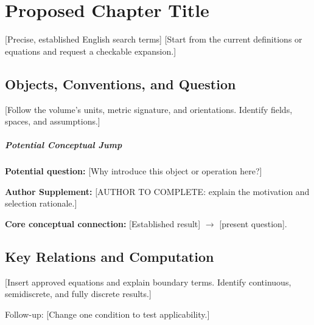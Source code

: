 \chapter{Proposed Chapter Title}\label{template:v2}
\begin{chaptersummary}
\end{chaptersummary}
{[Precise, established English search terms]}
{[Start from the current definitions or equations and request a checkable expansion.]}

\section{Objects, Conventions, and Question}
[Follow the volume's units, metric signature, and orientations.
Identify fields, spaces, and assumptions.]

\paragraph{Potential Conceptual Jump}
\textbf{Potential question:} [Why introduce this object or operation here?]\par
\textbf{Author Supplement:} [AUTHOR TO COMPLETE: explain the motivation and selection rationale.]\par
\textbf{Core conceptual connection:} [Established result] $\longrightarrow$ [present question].

\section{Key Relations and Computation}
[Insert approved equations and explain boundary terms.
Identify continuous, semidiscrete, and fully discrete results.]

\begin{askai}

Follow-up: [Change one condition to test applicability.]
\end{askai}

